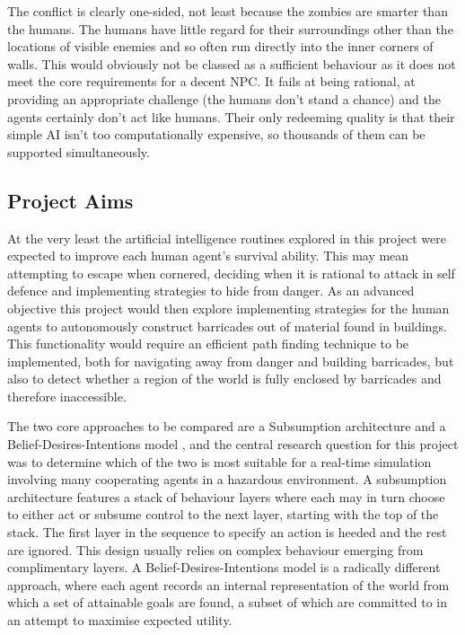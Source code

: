 \documentclass[a4paper,12pt]{article}
\begin{document}
The conflict is clearly one-sided, not least because the zombies are smarter than the humans. The humans have little regard for their surroundings other than the locations of visible enemies and so often run directly into the inner corners of walls. This would obviously not be classed as a sufficient behaviour as it does not meet the core requirements for a decent NPC. It fails at being rational, at providing an appropriate challenge (the humans don't stand a chance) and the agents certainly don't act like humans. Their only redeeming quality is that their simple AI isn't too computationally expensive, so thousands of them can be supported simultaneously.

\subsection{Project Aims}\noindent
At the very least the artificial intelligence routines explored in this project were expected to improve each human agent's survival ability. This may mean attempting to escape when cornered, deciding when it is rational to attack in self defence and implementing strategies to hide from danger. As an advanced objective this project would then explore implementing strategies for the human agents to autonomously construct barricades out of material found in buildings. This functionality would require an efficient path finding technique to be implemented, both for navigating away from danger and building barricades, but also to detect whether a region of the world is fully enclosed by barricades and therefore inaccessible.

The two core approaches to be compared are a Subsumption architecture \cite{brooks90} and a Belief-Desires-Intentions model \cite{rao95}, and the central research question for this project was to determine which of the two is most suitable for a real-time simulation involving many cooperating agents in a hazardous environment. A subsumption architecture features a stack of behaviour layers where each may in turn choose to either act or subsume control to the next layer, starting with the top of the stack. The first layer in the sequence to specify an action is heeded and the rest are ignored. This design usually relies on complex behaviour emerging from complimentary layers. A Belief-Desires-Intentions model is a radically different approach, where each agent records an internal representation of the world from which a set of attainable goals are found, a subset of which are committed to in an attempt to maximise expected utility.
\end{document}
